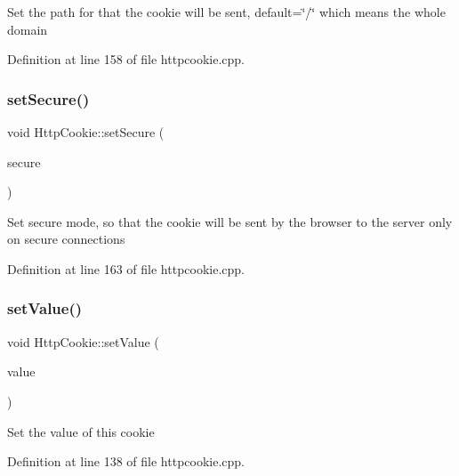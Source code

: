 Set the path for that the cookie will be sent, default=\char`\"{}/\char`\"{} which means the whole domain 

Definition at line 158 of file httpcookie.\+cpp.

\mbox{\label{classstefanfrings_1_1_http_cookie_a92a304128210efa82e317ee26fd041c5}} 
\subsubsection{\texorpdfstring{set\+Secure()}{setSecure()}}
{\footnotesize\ttfamily void Http\+Cookie\+::set\+Secure (\begin{DoxyParamCaption}\item[{const bool}]{secure }\end{DoxyParamCaption})}

Set secure mode, so that the cookie will be sent by the browser to the server only on secure connections 

Definition at line 163 of file httpcookie.\+cpp.

\mbox{\label{classstefanfrings_1_1_http_cookie_a5b931091d1d667895a117e86b301d101}} 
\subsubsection{\texorpdfstring{set\+Value()}{setValue()}}
{\footnotesize\ttfamily void Http\+Cookie\+::set\+Value (\begin{DoxyParamCaption}\item[{const Q\+Byte\+Array}]{value }\end{DoxyParamCaption})}

Set the value of this cookie 

Definition at line 138 of file httpcookie.\+cpp.

\mbox{\label{classstefanfrings_1_1_http_cookie_a90009f1b886162d08cc7ead31d6d8209}} 
